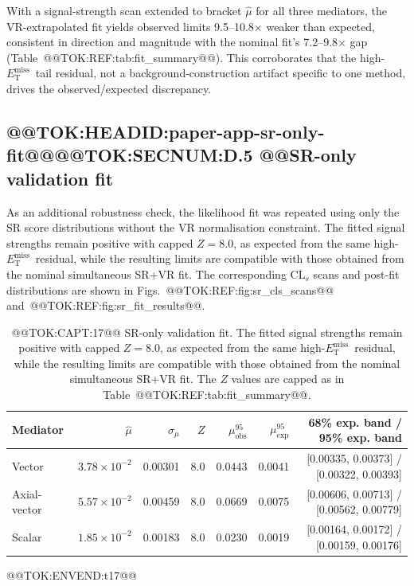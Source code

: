 \documentclass[11pt]{article}
\newcommand{\MET}{\ensuremath{E_{\mathrm{T}}^{\mathrm{miss}}}}
\begin{document}
With a signal-strength scan extended to bracket \(\hat{\mu}\) for all three
mediators, the VR-extrapolated fit yields observed limits 9.5--10.8\(\times\)
weaker than expected, consistent in direction and magnitude with the nominal
fit's 7.2--9.8\(\times\) gap (Table~@@TOK:REF:tab:fit_summary@@). This corroborates
that the high-\MET\ tail residual, not a background-construction artifact
specific to one method, drives the observed/expected discrepancy.
\subsection{@@TOK:HEADID:paper-app-sr-only-fit@@@@TOK:SECNUM:D.5 @@SR-only validation fit}
As an additional robustness check, the likelihood fit was repeated using
only the SR score distributions without the VR normalisation constraint.
The fitted signal strengths remain positive with capped \(Z=8.0\), as expected
from the same high-\MET\ residual, while the resulting limits are compatible with those
obtained from the nominal simultaneous SR+VR fit.
The corresponding $\mathrm{CL}_{s}$ scans and post-fit distributions are shown in
Figs.~@@TOK:REF:fig:sr_cls_scans@@ and~@@TOK:REF:fig:sr_fit_results@@.
\begin{table}[h]
\centering
\caption{@@TOK:CAPT:17@@ SR-only validation fit. The fitted signal strengths remain positive
with capped \(Z=8.0\), as expected from the same high-\MET\ residual, while
the resulting limits are compatible with those obtained from the nominal
simultaneous SR+VR fit. The \(Z\) values
are capped as in Table~@@TOK:REF:tab:fit_summary@@.}
\label{tab:appendix-sr-fit}
%
\begin{tabular}{lrrrrrr}
\toprule
Mediator & \(\hat{\mu}\) & \(\sigma_{\mu}\) & \(Z\) &
\(\mu^{95}_{\mathrm{obs}}\) & \(\mu^{95}_{\mathrm{exp}}\) &
68\% exp. band / 95\% exp. band \\
\midrule
Vector &
\(3.78\times10^{-2}\) &
0.00301 &
8.0 &
0.0443 &
0.0041 &
[0.00335, 0.00373] / [0.00322, 0.00393] \\
Axial-vector &
\(5.57\times10^{-2}\) &
0.00459 &
8.0 &
0.0669 &
0.0075 &
[0.00606, 0.00713] / [0.00562, 0.00779] \\
Scalar &
\(1.85\times10^{-2}\) &
0.00183 &
8.0 &
0.0230 &
0.0019 &
[0.00164, 0.00172] / [0.00159, 0.00176] \\
\bottomrule
\end{tabular}

@@TOK:ENVEND:t17@@\end{table}
\end{document}
